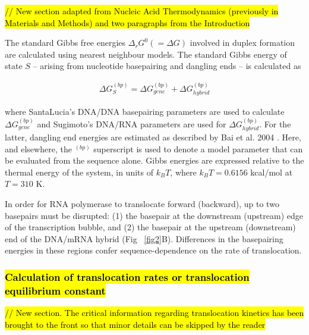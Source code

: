 \documentclass[10pt,letterpaper]{article}
\begin{document}
\hl{ // New section adapted from Nucleic Acid Thermodynamics (previously in Materials and Methods) and two paragraphs from the Introduction }


The standard Gibbs free energies $\Delta_r G^0 ( = \Delta G)$  involved in duplex formation are calculated using nearest neighbour models. The standard Gibbs energy of state $S$ -- arising from nucleotide basepairing and dangling ends -- is calculated as


\begin{eqnarray}
    \Delta G^{(bp)}_{S} =\Delta G^{(bp)}_{gene} +  \Delta G^{(bp)}_{hybrid}
\end{eqnarray}

where SantaLucia's DNA/DNA basepairing parameters \cite{santalucia1998unified} are used to calculate $\Delta G^{(bp)}_{gene}$ and Sugimoto's DNA/RNA parameters \cite{wu2002temperature} are used for $\Delta G^{(bp)}_{hybrid}$. For the latter, dangling end energies are estimated as described by Bai et al. 2004 \cite{bai2004sequence}. Here, and elsewhere, the $^{(bp)}$ superscript is used to denote a model parameter that can be evaluated from the sequence alone. Gibbs energies are expressed relative to the thermal energy of the system,  in units of $k_BT$, where $k_BT = 0.6156$ kcal/mol at $T=310$ K. \par





In order for RNA polymerase to translocate forward (backward), up to two basepairs must be disrupted: (1) the basepair at the downstream (upstream) edge of the transcription bubble, and (2) the basepair at the upstream (downstream) end of the DNA/mRNA hybrid (Fig ~\ref{fig2}B). Differences in the basepairing energies in these regions confer sequence-dependence on the rate of translocation.


\subsubsection*{\hl{Calculation of translocation rates or translocation equilibrium constant}}

\hl{ // New section. The critical information regarding translocation kinetics has been brought to the front so that minor details can be skipped by the reader}
\end{document}
